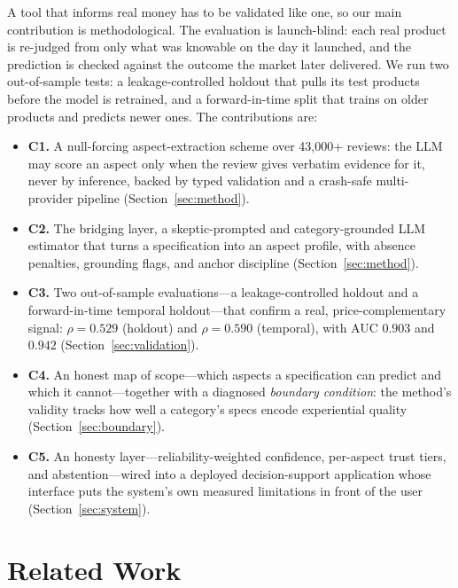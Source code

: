 \documentclass[journal]{IEEEtran}
\begin{document}
A tool that informs real money has to be validated like one, so our main contribution is methodological. The evaluation is launch-blind: each real product is re-judged from only what was knowable on the day it launched, and the prediction is checked against the outcome the market later delivered. We run two out-of-sample tests: a leakage-controlled holdout that pulls its test products before the model is retrained, and a forward-in-time split that trains on older products and predicts newer ones. The contributions are:

\begin{itemize}
\item \textbf{C1.} A null-forcing aspect-extraction scheme over 43{,}000+ reviews: the LLM may score an aspect only when the review gives verbatim evidence for it, never by inference, backed by typed validation and a crash-safe multi-provider pipeline (Section~\ref{sec:method}).
\item \textbf{C2.} The bridging layer, a skeptic-prompted and category-grounded LLM estimator that turns a specification into an aspect profile, with absence penalties, grounding flags, and anchor discipline (Section~\ref{sec:method}).
\item \textbf{C3.} Two out-of-sample evaluations---a leakage-controlled holdout and a forward-in-time temporal holdout---that confirm a real, price-complementary signal: $\rho = 0.529$ (holdout) and $\rho = 0.590$ (temporal), with AUC $0.903$ and $0.942$ (Section~\ref{sec:validation}).
\item \textbf{C4.} An honest map of scope---which aspects a specification can predict and which it cannot---together with a diagnosed \emph{boundary condition}: the method's validity tracks how well a category's specs encode experiential quality (Section~\ref{sec:boundary}).
\item \textbf{C5.} An honesty layer---reliability-weighted confidence, per-aspect trust tiers, and abstention---wired into a deployed decision-support application whose interface puts the system's own measured limitations in front of the user (Section~\ref{sec:system}).
\end{itemize}

\section{Related Work}
\label{sec:related}
\end{document}
